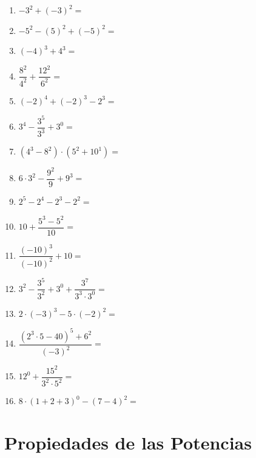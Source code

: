 \documentclass[12pt, letterpaper]{article}
\begin{document}
\begin{enumerate}[leftmargin=*, start=26]
  \item \medio{} $-3^2 + (-3)^2 =$

  \item \medio{} $-5^2 - (5)^2 + (-5)^2 =$

  \item \medio{} $(-4)^3 + 4^3 =$

  \item \medio{} $\dfrac{8^2}{4^2} + \dfrac{12^2}{6^2} =$

  \item \medio{} $(-2)^4 + (-2)^3 - 2^3 =$

  \item \medio{} $3^4 - \dfrac{3^5}{3^3} + 3^0 =$

  \item \medio{} $\left(4^3 - 8^2\right) \cdot \left(5^2 + 10^1\right) =$

  \item \medio{} $6 \cdot 3^2 - \dfrac{9^2}{9} + 9^3 =$

  \item \medio{} $2^5 - 2^4 - 2^3 - 2^2 =$

  \item \medio{} $10 + \dfrac{5^3 - 5^2}{10} =$

  \item \medio{} $\dfrac{(-10)^3}{(-10)^2} + 10 =$

  \item \dificil{} $3^2 - \dfrac{3^5}{3^2} + 3^0 + \dfrac{3^7}{3^3 \cdot 3^0} =$

  \item \medio{} $2 \cdot (-3)^3 - 5 \cdot (-2)^2 =$

  \item \dificil{} $\dfrac{\left(2^3 \cdot 5 - 40\right)^5 + 6^2}{(-3)^2} =$

  \item \medio{} $12^0 + \dfrac{15^2}{3^2 \cdot 5^2} =$

  \item \medio{} $8 \cdot (1 + 2 + 3)^0 - (7 - 4)^2 =$
\end{enumerate}



\section{Propiedades de las Potencias}
\end{document}
